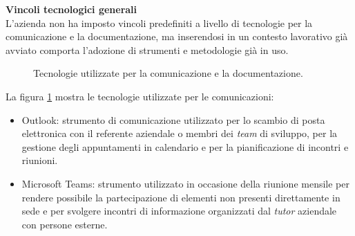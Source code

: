 \textbf{Vincoli tecnologici generali}\\
L'azienda non ha imposto vincoli predefiniti a livello di tecnologie per la comunicazione e la documentazione, ma inserendosi in un contesto lavorativo già avviato comporta l'adozione di strumenti e metodologie già in uso.
\begin{figure}[H]
\centering
{}
\caption{Tecnologie utilizzate per la comunicazione e la documentazione.}
\label{fig:doc_com}
\end{figure}
La figura \ref{fig:doc_com} mostra le tecnologie utilizzate per le comunicazioni: 
\begin{itemize}
    \item Outlook: strumento di comunicazione utilizzato per lo scambio di posta elettronica con il referente aziendale o membri dei \textit{team} di sviluppo, per la gestione degli appuntamenti in calendario e per la pianificazione di incontri e riunioni.
    \item Microsoft Teams: strumento utilizzato in occasione della riunione mensile per rendere possibile la partecipazione di elementi non presenti direttamente in sede e per svolgere incontri di informazione organizzati dal \textit{tutor} aziendale con persone esterne.
\end{itemize}

